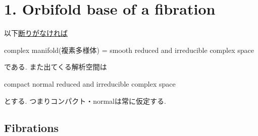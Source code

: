 \documentclass[dvipdfmx,a4paper,11pt]{article} %
\theoremstyle{definition}
\theoremstyle{remark}
\numberwithin{equation}{section}
\begin{document}
\section{1. Orbifold base of a fibration}
以下\underline{断りがなければ} 
\begin{center}
complex manifold(複素多様体) = smooth reduced and irreducible complex space
\end{center}
である.
また出てくる解析空間は
\begin{center}
compact normal reduced and irreducible complex space
\end{center}
とする. つまりコンパクト・normalは常に仮定する.

\subsection{Fibrations \cite[1.1]{Cam04}}
\end{document}
